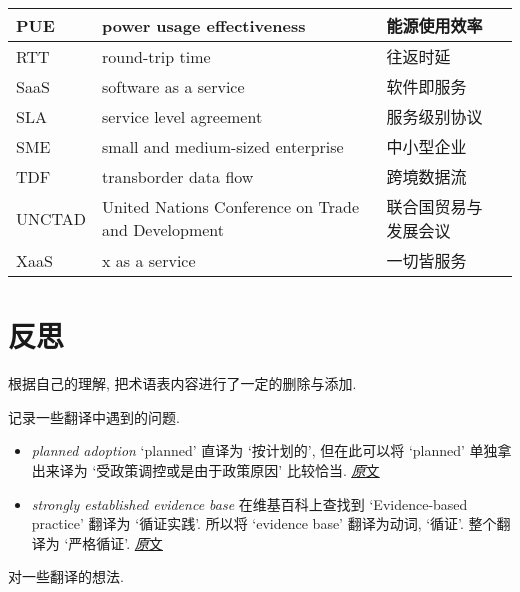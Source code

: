 \documentclass[a4paper, UTF8, 12pt]{article}
\begin{document}
\begin{longtable}{m{2cm}m{3cm}m{3cm}m{4cm}}
    \hline
    PUE & power usage effectiveness & 能源使用效率 & \\
    \hline
    RTT & round-trip time & 往返时延 & \\
    \hline
    SaaS & software as a service & 软件即服务 & \\
    \hline
    SLA & service level agreement & 服务级别协议 & \\ 
    \hline
    SME & small and medium-sized enterprise & 中小型企业 & \\
    \hline
    TDF & transborder data flow & 跨境数据流 & \\ 
    \hline
    UNCTAD & United Nations Conference on Trade and Development & 联合国贸易与发展会议 & \\
    \hline
    XaaS & x as a service & 一切皆服务 & \\
    \hline
\end{longtable}

\section{反思}
根据自己的理解, 把术语表内容进行了一定的删除与添加.

记录一些翻译中遇到的问题.

\begin{itemize}
    \item \emph{planned adoption} `planned' 直译为 `按计划的', 但在此可以将 `planned' 单独拿出来译为 `受政策调控或是由于政策原因' 比较恰当. \hyperlink{par:01}{\underline{\emph 原文}}
    \item \emph{strongly established evidence base} 在维基百科上查找到 `Evidence-based practice' 翻译为 `循证实践'. 所以将 `evidence base' 翻译为动词, `循证'. 整个翻译为 `严格循证'. \hyperlink{par:02}{\underline{\emph 原文}}
   
\end{itemize}

对一些翻译的想法.
\end{document}
